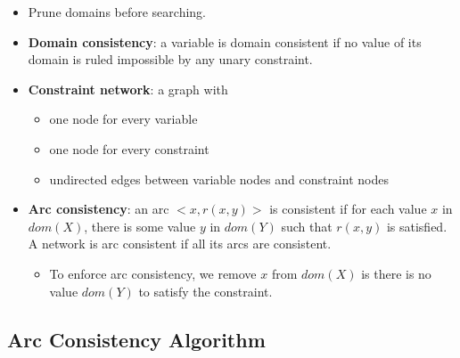 \documentclass{article}
\begin{document}
\begin{itemize}
    \item Prune domains before searching.
    \item \textbf{Domain consistency}: a variable is domain consistent if no value of its domain is ruled impossible by any unary constraint.
    \item \textbf{Constraint network}: a graph with
        \begin{itemize}
            \item one node for every variable
            \item one node for every constraint
            \item undirected edges between variable nodes and constraint nodes
        \end{itemize}
    \item \textbf{Arc consistency}: an arc $<x, r(x, y)>$ is consistent if for each value $x$ in $dom(X)$, there is some value $y$ in $dom(Y)$ such that $r(x, y)$ is satisfied. A network is arc consistent if all its arcs are consistent.
        \begin{itemize}
            \item To enforce arc consistency, we remove $x$ from $dom(X)$ is there is no value $dom(Y)$ to satisfy the constraint.
        \end{itemize}
\end{itemize}

\subsection{Arc Consistency Algorithm}
\end{document}
